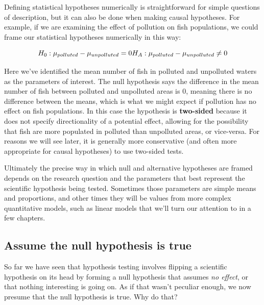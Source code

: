 \documentclass[
]{book}
\begin{document}
Defining statistical hypotheses numerically is straightforward for simple questions of description, but it can also be done when making causal hypotheses. For example, if we are examining the effect of pollution on fish populations, we could frame our statistical hypotheses numerically in this way:

\[
H_0: \mu_{polluted}-\mu_{unpolluted}=0 \\
H_A: \mu_{polluted}-\mu_{unpolluted}\neq0
\]

Here we've identified the mean number of fish in polluted and unpolluted waters as the parameters of interest. The null hypothesis says the difference in the mean number of fish between polluted and unpolluted areas is 0, meaning there is no difference between the means, which is what we might expect if pollution has no effect on fish populations. In this case the hypothesis is \textbf{two-sided} because it does not specify directionality of a potential effect, allowing for the possibility that fish are more populated in polluted than unpolluted areas, or vice-versa. For reasons we will see later, it is generally more conservative (and often more appropriate for causal hypotheses) to use two-sided tests.

Ultimately the precise way in which null and alternative hypotheses are framed depends on the research question and the parameters that best represent the scientific hypothesis being tested. Sometimes those parameters are simple means and proportions, and other times they will be values from more complex quantitative models, such as linear models that we'll turn our attention to in a few chapters.

\subsection{Assume the null hypothesis is true}\label{assume-the-null-hypothesis-is-true}

So far we have seen that hypothesis testing involves flipping a scientific hypothesis on its head by forming a null hypothesis that assumes \emph{no effect}, or that nothing interesting is going on. As if that wasn't peculiar enough, we now presume that the null hypothesis is true. Why do that?
\end{document}
